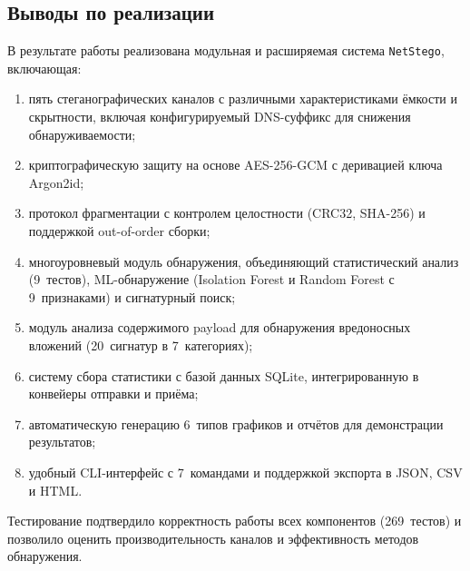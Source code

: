 \subsection{Выводы по реализации}

В результате работы реализована модульная и расширяемая система \texttt{NetStego}, включающая:
\begin{enumerate}[label=\arabic*)]
    \item пять стеганографических каналов с различными характеристиками ёмкости и скрытности, включая конфигурируемый DNS-суффикс для снижения обнаруживаемости;
    \item криптографическую защиту на основе AES-256-GCM с деривацией ключа Argon2id;
    \item протокол фрагментации с контролем целостности (CRC32, SHA-256) и поддержкой out-of-order сборки;
    \item многоуровневый модуль обнаружения, объединяющий статистический анализ (9~тестов), ML-обнаружение (Isolation Forest и Random Forest с 9~признаками) и сигнатурный поиск;
    \item модуль анализа содержимого payload для обнаружения вредоносных вложений (20~сигнатур в 7~категориях);
    \item систему сбора статистики с базой данных SQLite, интегрированную в конвейеры отправки и приёма;
    \item автоматическую генерацию 6~типов графиков и отчётов для демонстрации результатов;
    \item удобный CLI-интерфейс с 7~командами и поддержкой экспорта в JSON, CSV и HTML.
\end{enumerate}

Тестирование подтвердило корректность работы всех компонентов (269~тестов) и позволило оценить производительность каналов и эффективность методов обнаружения.
